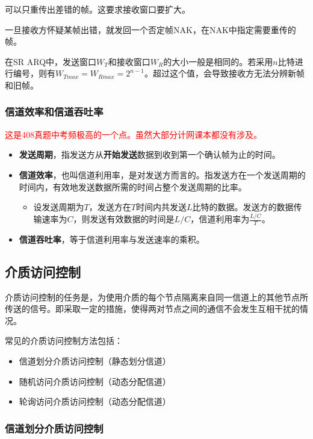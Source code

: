 \documentclass[12pt, a4paper, oneside]{ctexart}
\begin{document}
可以只重传出差错的帧。这要求接收窗口要扩大。

一旦接收方怀疑某帧出错，就发回一个否定帧NAK，在NAK中指定需要重传的帧。

在SR ARQ中，发送窗口$W_T$和接收窗口$W_R$的大小一般是相同的。若采用$n$比特进行编号，则有$W_{Tmax}=W_{Rmax}=2^{n-1}$。超过这个值，会导致接收方无法分辨新帧和旧帧。

\subsubsection{信道效率和信道吞吐率}

\textcolor{red}{这是408真题中考频极高的一个点。虽然大部分计网课本都没有涉及。}

\begin{itemize}
    \item {\bf 发送周期}，指发送方从\textbf{开始发送}数据到收到第一个确认帧为止的时间。
    \item {\bf 信道效率}，也叫信道利用率，是对发送方而言的。指发送方在一个发送周期的时间内，有效地发送数据所需的时间占整个发送周期的比率。
    \begin{itemize}
        \item 设发送周期为$T$，发送方在$T$时间内共发送$L$比特的数据。发送方的数据传输速率为$C$，则发送有效数据的时间是$L/C$，信道利用率为$\frac{L/C}{T}$。
    \end{itemize}
    \item {\bf 信道吞吐率}，等于信道利用率与发送速率的乘积。
\end{itemize}

\subsection{介质访问控制}

介质访问控制的任务是，为使用介质的每个节点隔离来自同一信道上的其他节点所传送的信号。即采取一定的措施，使得两对节点之间的通信不会发生互相干扰的情况。

常见的介质访问控制方法包括：
\begin{itemize}
    \item 信道划分介质访问控制（静态划分信道）
    \item 随机访问介质访问控制（动态分配信道）
    \item 轮询访问介质访问控制（动态分配信道）
\end{itemize}

\subsubsection{信道划分介质访问控制}
\end{document}
